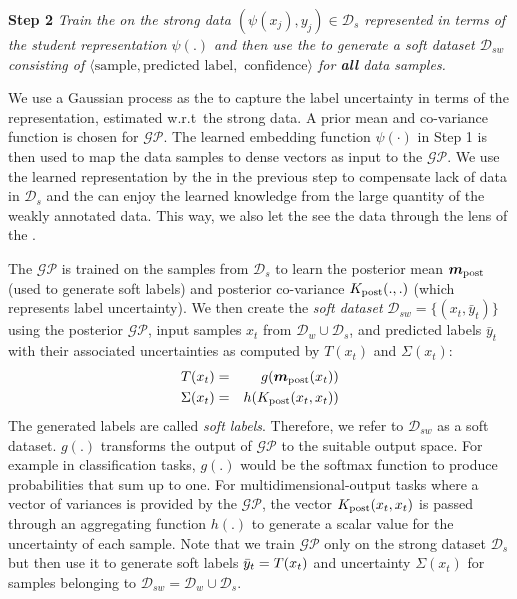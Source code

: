 \textbf{Step 2} \emph{Train the \tch on the strong data $(\psi(x_j),y_j) \in \mathcal{D}_s$ represented in terms of the student representation $\psi(.)$ and then use the \tch to generate a soft dataset $\mathcal{D}_{sw}$ consisting of $\langle \textrm{sample}, \textrm{predicted label}, \textrm{ confidence} \rangle$ for \textbf{all} data samples.} 

We use a Gaussian process as the \tch to capture the label uncertainty in terms of the \std representation, estimated w.r.t\ the strong data. A prior mean and co-variance function is chosen for $\mathcal{GP}$. The learned embedding function $\psi(\cdot)$ in Step 1 is then used to map the data samples to dense vectors as input to the $\mathcal{GP}$. 
We use the learned representation by the \std in the previous step to compensate lack of data in $\mathcal{D}_s$ and the \tch can enjoy the learned knowledge from the large quantity of the weakly annotated data. This way, we also let the \tch  see the data through the lens of the \std.

The $\mathcal{GP}$ is trained on the samples from $\mathcal{D}_s$ to learn the posterior mean $\bm{m}_{\rm post}$ (used to generate soft labels) and posterior co-variance $K_{\rm post}(.,.)$ (which represents label uncertainty).
We then create the \emph{soft dataset} $\mathcal{D}_{sw}=\{(x_t,\bar{y}_t)\}$ using the posterior $\mathcal{GP}$, input samples $x_t$ from $\mathcal{D}_w \cup \mathcal{D}_s$, and predicted labels $\bar{y}_t$ with their associated uncertainties as computed by $T(x_t)$ and $\Sigma(x_t)$:
\begin{eqnarray*}
\tfunc(x_t) &=& g(\bm{m}_{\rm post}(x_t))\\
\Sigma(x_t) &=& h(K_{\rm post}(x_t,x_t))
\sshrink
\end{eqnarray*}
The generated labels are called \emph{soft labels}. Therefore, we refer to $\mathcal{D}_{sw}$ as a soft dataset. $g(.)$ transforms the output of $\mathcal{GP}$ to the suitable output space. For example in classification tasks, $g(.)$ would be the softmax function to produce probabilities that sum up to one. 
For multidimensional-output tasks where a vector of variances is provided by the $\mathcal{GP}$, the vector $K_{\rm post}(x_t,x_t)$ is passed through an aggregating function $h(.)$ to generate a scalar value for the uncertainty of each sample. 
Note that we train $\mathcal{GP}$ only on the strong dataset $\mathcal{D}_s$ but then use it to generate soft labels $\bar{y}_t = T(x_t)$ and uncertainty $\Sigma(x_t)$ for samples belonging to $\mathcal{D}_{sw}=\mathcal{D}_w\cup \mathcal{D}_s$.

